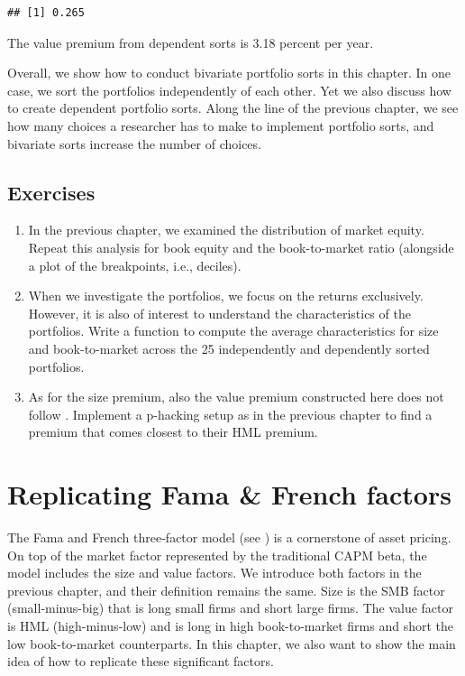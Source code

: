 \documentclass[
]{krantz}
\providecommand{\tightlist}{%
  \setlength{\itemsep}{0pt}\setlength{\parskip}{0pt}}
\begin{document}
\begin{verbatim}
## [1] 0.265
\end{verbatim}

The value premium from dependent sorts is 3.18 percent per year.

Overall, we show how to conduct bivariate portfolio sorts in this chapter. In one case, we sort the portfolios independently of each other. Yet we also discuss how to create dependent portfolio sorts. Along the line of the previous chapter, we see how many choices a researcher has to make to implement portfolio sorts, and bivariate sorts increase the number of choices.

\hypertarget{exercises-5}{%
\section{Exercises}\label{exercises-5}}

\begin{enumerate}
\def\labelenumi{\arabic{enumi}.}
\tightlist
\item
  In the previous chapter, we examined the distribution of market equity. Repeat this analysis for book equity and the book-to-market ratio (alongside a plot of the breakpoints, i.e., deciles).
\item
  When we investigate the portfolios, we focus on the returns exclusively. However, it is also of interest to understand the characteristics of the portfolios. Write a function to compute the average characteristics for size and book-to-market across the 25 independently and dependently sorted portfolios.
\item
  As for the size premium, also the value premium constructed here does not follow \citet{Fama1993}. Implement a p-hacking setup as in the previous chapter to find a premium that comes closest to their HML premium.
\end{enumerate}

\hypertarget{replicating-fama-french-factors}{%
\chapter{Replicating Fama \& French factors}\label{replicating-fama-french-factors}}

The Fama and French three-factor model (see \citet{Fama1993}) is a cornerstone of asset pricing. On top of the market factor represented by the traditional CAPM beta, the model includes the size and value factors. We introduce both factors in the previous chapter, and their definition remains the same. Size is the SMB factor (small-minus-big) that is long small firms and short large firms. The value factor is HML (high-minus-low) and is long in high book-to-market firms and short the low book-to-market counterparts. In this chapter, we also want to show the main idea of how to replicate these significant factors.
\end{document}
